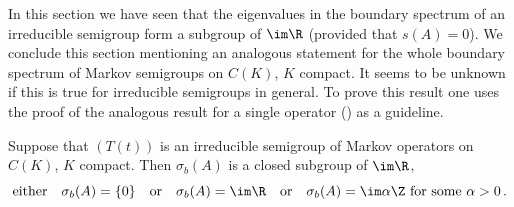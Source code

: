 In this section we have seen that the eigenvalues in the boundary spectrum of an irreducible semigroup form a subgroup of\/ $\im \R$ (provided that $s(A) = 0$).
We conclude this section mentioning an analogous statement for the whole boundary spectrum of Markov semigroups on $C(K)$, $K$ compact.
It seems to be unknown if this is true for irreducible semigroups in general.
To prove this result one uses the proof of the analogous result for a single operator (\cf \textcite[Theorem~7]{schaefer:1968}) as a guideline.
\begin{theorem}\label{thm:b3-3.11}
	Suppose that $(T(t))$ is an irreducible semigroup of Markov operators%
    on $C(K)$, $K$ compact.
	Then $\sigma_{b}(A)$ is a closed subgroup of\/ $\im \R$, \ie
   \[%
   \text{either}\quad \sigma_{b}(A) = \{0\}\quad\text{or}\quad \sigma_{b}(A) = \im\R\quad\text{or}\quad\sigma_{b}(A) =\im\alpha\Z \text{  for some } \alpha > 0\,.
   \]
\end{theorem}
